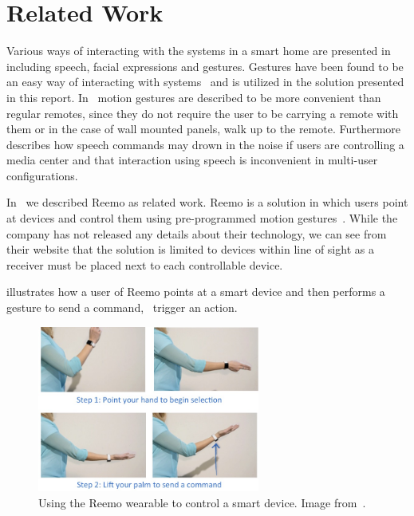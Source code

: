 \section{Related Work}
\label{sec:related-work}

Various ways of interacting with the systems in a smart home are presented in~\cite[pp. 9-10]{cook2007smart} including speech, facial expressions and gestures. Gestures have been found to be an easy way of interacting with systems~\cite[p. 6]{rahman2011motion} and is utilized in the solution presented in this report. In~\cite[pp. 2-3]{starner2000gesture} motion gestures are described to be more convenient than regular remotes, since they do not require the user to be carrying a remote with them or in the case of wall mounted panels, walk up to the remote. Furthermore~\cite{starner2000gesture} describes how speech commands may drown in the noise if users are controlling a media center and that interaction using speech is inconvenient in multi-user configurations.

In~\cite[pp. 9-11]{prespecialisation} we described Reemo as related work. Reemo is a solution in which users point at devices and control them using pre-programmed motion gestures~\cite{reemo:about}. While the company has not released any details about their technology, we can see from their website that the solution is limited to devices within line of sight as a receiver must be placed next to each controllable device.

 illustrates how a user of Reemo points at a smart device and then performs a gesture to send a command, \ie~trigger an action.

\begin{figure}[!hbt]
\centering
\includegraphics[width=0.65\textwidth]{images/reemo}
\caption{Using the Reemo wearable to control a smart device. Image from~\cite{prespecialisation}.}
\label{fig:introduction:gesture-control:reemo}
\end{figure}

